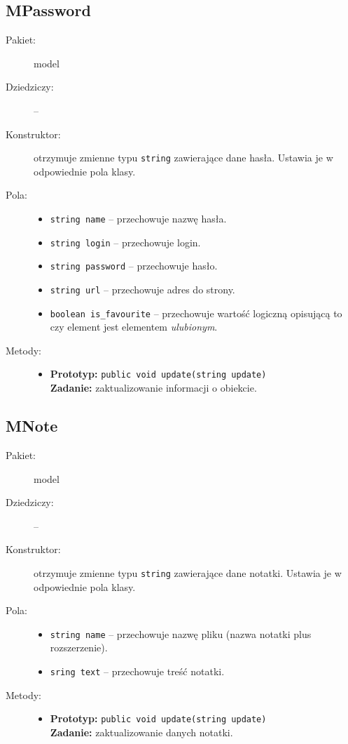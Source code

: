 \documentclass[a4paper]{article}
\newcommand{\prog}{\texttt}
\begin{document}
\subsection{MPassword}
\begin{description}
    \item[Pakiet:] model
    \item[Dziedziczy:] --
    \item[Konstruktor:] otrzymuje zmienne typu \prog{string} zawierające dane hasła. Ustawia je w odpowiednie pola klasy.
    \item[Pola:] \hfill
    \begin{itemize}
        \item \prog{string name} -- przechowuje nazwę hasła.
        \item \prog{string login} -- przechowuje login.
        \item \prog{string password} -- przechowuje hasło.
        \item \prog{string url} -- przechowuje adres do strony.
        \item \prog{boolean is\_favourite} -- przechowuje wartość logiczną opisującą to czy element jest elementem \textit{ulubionym}.
    \end{itemize}
    \item[Metody:] \hfill
    \begin{itemize}
      \item \textbf{Prototyp:} \prog{public void update(string update)}\\\textbf{Zadanie:} zaktualizowanie informacji o obiekcie.
    \end{itemize}
\end{description}

\subsection{MNote}
\begin{description}
    \item[Pakiet:] model
    \item[Dziedziczy:] --
    \item[Konstruktor:] otrzymuje zmienne typu \prog{string} zawierające dane notatki. Ustawia je w odpowiednie pola klasy.
    \item[Pola:] \hfill
    \begin{itemize}
        \item \prog{string name} -- przechowuje nazwę pliku (nazwa notatki plus rozszerzenie).
        \item \prog{sring text} -- przechowuje treść notatki.
    \end{itemize}
    \item[Metody:] \hfill
    \begin{itemize}
        \item \textbf{Prototyp:} \prog{public void update(string update)}\\\textbf{Zadanie:} zaktualizowanie danych notatki.
    \end{itemize}
\end{description}
\end{document}
